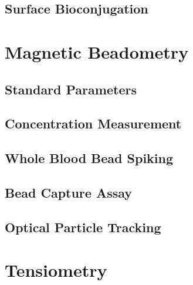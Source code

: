 \subsection{Surface Bioconjugation}

\section{Magnetic Beadometry}

\subsection{Standard Parameters}

\subsection{Concentration Measurement}

\subsection{Whole Blood Bead Spiking}

\subsection{Bead Capture Assay}

\subsection{Optical Particle Tracking}

\section{Tensiometry}



